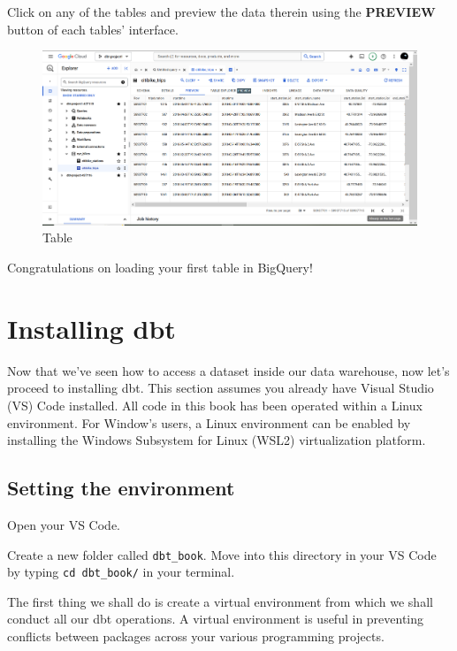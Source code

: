 \documentclass[
]{book}
\begin{document}
Click on any of the tables and preview the data therein using the \textbf{PREVIEW} button of each tables' interface.

\begin{figure}
\centering
\includegraphics{./images/table_interface.png}
\caption{Table}
\end{figure}

Congratulations on loading your first table in BigQuery!

\hypertarget{installing-dbt}{%
\chapter{Installing dbt}\label{installing-dbt}}

Now that we've seen how to access a dataset inside our data warehouse, now let's proceed to installing dbt. This section assumes you already have Visual Studio (VS) Code installed. All code in this book has been operated within a Linux environment. For Window's users, a Linux environment can be enabled by installing the Windows Subsystem for Linux (WSL2) virtualization platform.

\hypertarget{setting-the-environment}{%
\section{Setting the environment}\label{setting-the-environment}}

Open your VS Code.

Create a new folder called \texttt{dbt\_book}. Move into this directory in your VS Code by typing \texttt{cd\ dbt\_book/} in your terminal.

The first thing we shall do is create a virtual environment from which we shall conduct all our dbt operations. A virtual environment is useful in preventing conflicts between packages across your various programming projects.
\end{document}
